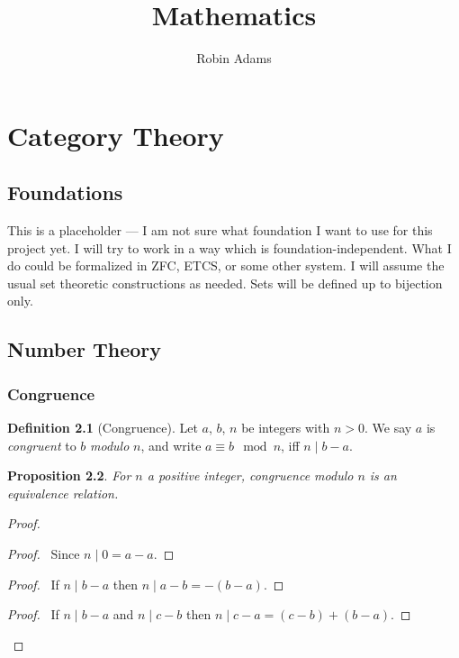 \documentclass{book}
\title{Mathematics}
\author{Robin Adams}
\let\qed\relax
\newtheorem{prop}{Proposition}[chapter]
\theoremstyle{definition}
\newtheorem{df}[prop]{Definition}
\begin{document}
\maketitle
\tableofcontents

\part{Category Theory}

\chapter{Foundations}

This is a placeholder --- I am not sure what foundation I want to use for this project yet. I will try to work in a way which is foundation-independent. What I do could be formalized in ZFC, ETCS, or some other system. I will assume the usual set theoretic constructions as needed. Sets will be defined up to bijection only.

\chapter{Number Theory}

\section{Congruence}

\begin{df}[Congruence]
    Let $a$, $b$, $n$ be integers with $n > 0$. We say $a$ is \emph{congruent} to $b$ \emph{modulo} $n$, and write $a \equiv b \mod n$, iff $n \mid b - a$.
\end{df}

\begin{prop}
    For $n$ a positive integer, congruence modulo $n$ is an equivalence relation.
\end{prop}

\begin{proof}
    \pf
    \begin{proof}
        \pf\ Since $n \mid 0 = a - a$.
    \end{proof}
    \begin{proof}
        \pf\ If $n \mid b - a$ then $n \mid a - b = -(b-a)$.
    \end{proof}
    \begin{proof}
        \pf\ If $n \mid b - a$ and $n \mid c - b$ then $n \mid c - a = (c - b) + (b - a)$.
    \end{proof}
    \qed
\end{proof}
\end{document}
